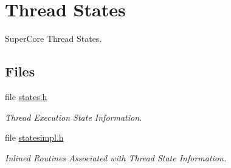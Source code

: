 \hypertarget{group__RTEMSScoreStates}{}\section{Thread States}
\label{group__RTEMSScoreStates}


Super\+Core Thread States.  


\subsection*{Files}
\begin{DoxyCompactItemize}
\item 
file \mbox{\hyperlink{states_8h}{states.\+h}}
\begin{DoxyCompactList}\small\item\em Thread Execution State Information. \end{DoxyCompactList}\item 
file \mbox{\hyperlink{statesimpl_8h}{statesimpl.\+h}}
\begin{DoxyCompactList}\small\item\em Inlined Routines Associated with Thread State Information. \end{DoxyCompactList}\end{DoxyCompactItemize}
